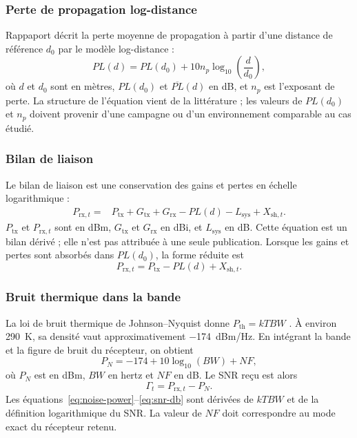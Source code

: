 \documentclass[conference,a4paper]{IEEEtran}
\begin{document}
\subsubsection{Perte de propagation log-distance}
Rappaport décrit la perte moyenne de propagation à partir d'une distance de référence $d_0$ par le modèle log-distance \cite[Chap.~4]{rappaport2002} :
\begin{equation}
    {PL}(d)=PL(d_0)+10n_p\log_{10}\!\left(\frac{d}{d_0}\right),
    \label{eq:path-loss}
\end{equation}
où $d$ et $d_0$ sont en mètres, $PL(d_0)$ et $\overline{PL}(d)$ en dB, et $n_p$ est l'exposant de perte. La structure de l'équation vient de la littérature ; les valeurs de $PL(d_0)$ et $n_p$ doivent provenir d'une campagne ou d'un environnement comparable au cas étudié.

\subsubsection{Bilan de liaison}
Le bilan de liaison est une conservation des gains et pertes en échelle logarithmique :
\begin{equation}
\begin{split}
P_{\mathrm{rx},t}={}&P_{\mathrm{tx}}+G_{\mathrm{tx}}+G_{\mathrm{rx}}
-{PL}(d)-L_{\mathrm{sys}}+X_{\mathrm{sh},t}.
\end{split}
\label{eq:link-budget}
\end{equation}
$P_{\mathrm{tx}}$ et $P_{\mathrm{rx},t}$ sont en dBm, $G_{\mathrm{tx}}$ et $G_{\mathrm{rx}}$ en dBi, et $L_{\mathrm{sys}}$ en dB. Cette équation est un bilan dérivé ; elle n'est pas attribuée à une seule publication. Lorsque les gains et pertes sont absorbés dans $PL(d_0)$, la forme réduite est
\begin{equation}
    P_{\mathrm{rx},t}=P_{\mathrm{tx}}-{PL}(d)+X_{\mathrm{sh},t}.
\end{equation}

\subsubsection{Bruit thermique dans la bande}
La loi de bruit thermique de Johnson--Nyquist donne $P_{\mathrm{th}}=kTBW$ \cite{johnson1928,nyquist1928}. À environ \SI{290}{K}, sa densité vaut approximativement \SI{-174}{dBm/Hz}. En intégrant la bande et la figure de bruit du récepteur, on obtient
\begin{equation}
    P_N=-174+10\log_{10}(BW)+NF,
    \label{eq:noise-power}
\end{equation}
où $P_N$ est en dBm, $BW$ en hertz et $NF$ en dB. Le SNR reçu est alors
\begin{equation}
    \Gamma_t=P_{\mathrm{rx},t}-P_N.
    \label{eq:snr-db}
\end{equation}
Les équations~\eqref{eq:noise-power}--\eqref{eq:snr-db} sont dérivées de $kTBW$ et de la définition logarithmique du SNR. La valeur de $NF$ doit correspondre au mode exact du récepteur retenu.
\end{document}
